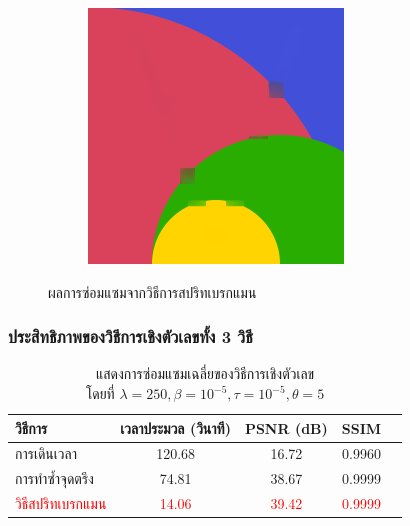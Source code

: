 \documentclass[xcolor=dvipsnames, xetex,serif]{beamer}
\numberwithin{equation}{section}
\begin{document}
\begin{frame}
\begin{figure}[H]
\begin{subfigure}{0.15\linewidth}
            \end{subfigure}
            \begin{subfigure}{0.15\linewidth}
                \centering
                \includegraphics[width=0.9\linewidth]{images/result_ex1/splitbergman05.png}
            \end{subfigure}
            \caption{ผลการซ่อมแซมจากวิธีการสปริทเบรกแมน}
        \end{figure}
    \end{frame}
    \begin{frame}
        \frametitle{ประสิทธิภาพของวิธีการเชิงตัวเลขทั้ง 3 วิธี}
        \begin{table}[H]
        \centering
        \captionsetup{justification=centering}
            \begin{tabular}[ht]{|l|c|c|c|c|}
                \hline
                วิธีการ  & เวลาประมวล  (วินาที) & PSNR (dB) & SSIM \\
                \hline
                การเดินเวลา & 120.68 & 16.72 & 0.9960 \\
                การทำซ้ำจุดตรึง & 74.81 & 38.67 & 0.9999 \\
                \textcolor{red}{วิธีสปริทเบรกแมน} & \textcolor{red}{14.06} & \textcolor{red}{39.42} & \textcolor{red}{0.9999}  \\
                \hline
            \end{tabular}
        \caption{แสดงการซ่อมแซมเฉลี่ยของวิธีการเชิงตัวเลข \\ โดยที่ $\lambda = 250, \beta = 10^{-5}, \tau = 10^{-5}, \theta = 5 $}
        \end{table}	
    \end{frame}
\end{document}
